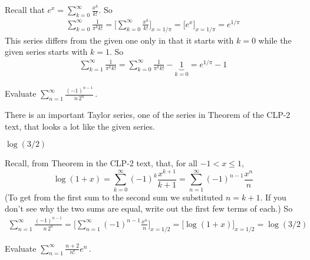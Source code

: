 \begin{solution}
Recall that $e^x = \displaystyle\sum\limits_{k=0}^\infty\frac{x^k}{k!}$. So
\begin{align*}
\sum_{k=0}^\infty\frac{1}{\pi^k k!}
=\Big[\sum_{k=0}^\infty\frac{x^k}{k!}\Big]_{x=1/\pi}
=\Big[e^x\Big]_{x=1/\pi}
=e^{1/\pi}
\end{align*}
This series differs from the given one only in that it starts with $k=0$ while
the given series starts with $k=1$. So
\begin{align*}
\sum_{k=1}^\infty\frac{1}{\pi^k k!}
=\sum_{k=0}^\infty\frac{1}{\pi^k k!} -\underbrace{1}_{k=0}
=e^{1/\pi}-1
\end{align*}

\end{solution}

\begin{Mquestion}[2012A]
Evaluate
${\displaystyle\sum_{n=1}^\infty\frac{(-1)^{n-1}}{n\, 2^n}}\,$.
\end{Mquestion}

\begin{hint}
There is an important Taylor series, one of the series in
Theorem  of the
CLP-2 text, that looks a lot like the given series.
\end{hint}

\begin{answer}
$\log(3/2)$
\end{answer}

\begin{solution}
Recall, from Theorem  in the CLP-2 text, that, for all $-1<x\le 1$,
\begin{equation*}
    \log(1+x) = \sum_{k=0}^\infty(-1)^k\frac{x^{k+1}}{k+1}
                    = \sum_{n=1}^\infty(-1)^{n-1}\frac{x^n}{n}
\end{equation*}
(To get from the first sum to the second sum we substituted $n=k+1$. If you don't see
why the two sums are equal, write out the first few terms of each.)
So
\begin{align*}
\sum_{n=1}^\infty\frac{(-1)^{n-1}}{n\, 2^n}
=\Big[\sum_{n=1}^\infty(-1)^{n-1}\frac{x^n}{n}\Big]_{x=1/2}
=\Big[\log(1+x)\Big]_{x=1/2}
=\log(3/2)
\end{align*}
\end{solution}


\begin{Mquestion}[M121 2012A]
Evaluate
${\displaystyle\sum_{n=1}^\infty\frac{n+2}{n!}e^n}\,$.
\end{Mquestion}

